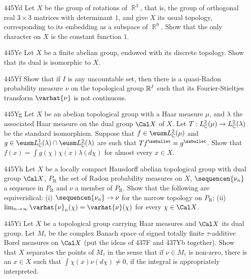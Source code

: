 {\spheader 445Yd Let $X$ be the group of rotations of $\BbbR^3$, that
is, the group of orthogonal real $3\times 3$ matrices with determinant
$1$, and give $X$ its usual topology, corresponding to its embedding as
a subspace of $\BbbR^9$.   Show that the only character on $X$ is the
constant function $1$.   

\spheader 445Ye Let $X$ be a finite abelian group, endowed with its
discrete topology.   Show that its dual is isomorphic to $X$.

\spheader 445Yf Show that if $I$ is any uncountable set, then there is a
quasi-Radon probability measure $\nu$ on the topological group
$\Bbb R^I$ such that its Fourier-Stieltjes transform
$\varhat{\nu}$ is not continuous.   

\spheader 445Yg Let $X$ be an abelian topological group with a Haar
measure $\mu$, and $\lambda$ the associated Haar measure on the dual
group $\Cal X$ of $X$.   Let
$T:L_{\Bbb C}^2(\mu)\to L_{\Bbb C}^2(\lambda)$ be the
standard isomorphism.   Suppose that $f\in\eusm L_{\Bbb C}^2(\mu)$ and
$g\in\eusm L_{\Bbb C}^1(\lambda)\cap\eusm L_{\Bbb C}^2(\lambda)$ are such
that $Tf^{\ssbullet}=g^{\ssbullet}$.   Show that
$f(x)=\int g(\chi)\overline{\chi(x)}\lambda(d\chi)$ for almost every
$x\in X$.   

\spheader 445Yh Let $X$ be a locally compact Hausdorff abelian
topological group
with dual group $\Cal X$, $P_{\text{R}}$ the set of Radon probability
measures on $X$, $\sequencen{\nu_n}$ a sequence in $P_{\text{R}}$ and
$\nu$ a member of $P_{\text{R}}$.
Show that the following are equiveridical:  (i)
$\sequencen{\nu_n}\to\nu$ for the narrow topology on $P_{\text{R}}$;
(ii) $\lim_{n\to\infty}\varhat{\nu}_n(\chi)=\varhat{\nu}(\chi)$ for every
$\chi\in\Cal X$.   

\spheader 445Yi Let $X$ be a topological group carrying Haar measures
and $\Cal X$ its dual group.   Let $M_{\tau}$ be the complex Banach
space of signed totally finite $\tau$-additive Borel measures on
$\Cal X$ (put the ideas of 437F and 437Yb together).   Show that $X$
separates
the points of $M_{\tau}$ in the sense that if $\nu\in M_{\tau}$ is
non-zero, there is an $x\in X$ such that $\int\chi(x)\nu(d\chi)\ne 0$,
if the integral is appropriately interpreted.

}
